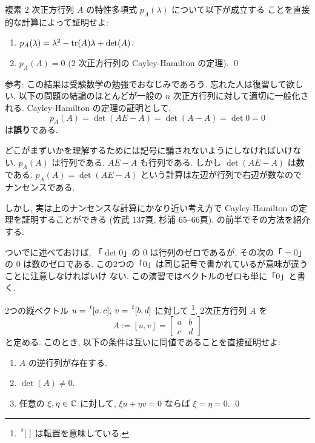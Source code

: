 \documentclass[12pt,twoside]{jarticle}
\begin{document}

\begin{question}[簡単過ぎるので3点]
  \label{q:char-poly-2.1}
  複素 $2$ 次正方行列 $A$ の特性多項式 $p_A(\lambda)$ について以下が成立する
  ことを直接的な計算によって証明せよ: 
  \begin{enumerate}
  \item[(1)] \( p_A(\lambda) = \lambda^2 - \mathop{\mathrm{tr}}\nolimits(A)\lambda + \det(A) \).
  \item[(2)] \( p_A(A) = 0 \) \quad ($2$ 次正方行列の Cayley-Hamilton の定理).
  \qed
  \end{enumerate}
\end{question}

\noindent 
参考: この結果は受験数学の勉強でおなじみであろう.
忘れた人は復習して欲しい.  
以下の問題の結論のほとんどが一般の $n$ 次正方行列に対して適切に一般化される. 
Cayley-Hamilton の定理の証明として,
\begin{equation*}
 p_A(A) = \det(AE - A) = \det(A - A) = \det 0 = 0
\end{equation*}
は{\bf 誤り}である. 

どこがまずいかを理解するためには記号に騙されないようにしなければいけない.
$p_A(A)$ は行列である.  $AE - A$ も行列である.  
しかし $\det(AE-A)$ は数である.  
$p_A(A)=\det(AE-A)$ という計算は左辺が行列で右辺が数なのでナンセンスである.

しかし, 実は上のナンセンスな計算にかなり近い考え方で 
Cayley-Hamilton の定理を証明することができる
(佐武 \cite{satake} 137頁, 杉浦 \cite{sugiura} 65--66頁).
 の前半でその方法を紹介する.

ついでに述べておけば, 「$\det 0$」の $0$ は行列のゼロであるが, 
その次の「$= 0$」の $0$ は数のゼロである.
この2つの「$0$」は同じ記号で書かれているが意味が違うことに注意しなければいけ
ない.  この演習ではベクトルのゼロも単に「$0$」と書く.


\begin{question}[5点]
  2つの縦ベクトル %
  $u=\tp{[a, c]}$, $v=\tp{[b, d]}$ に対して%
  \footnote{$\tp{[\ ]}$ は転置を意味している.}, 2次正方行列 $A$ を
  \begin{equation*}
    A := [u, v] = \begin{bmatrix} a & b \\ c & d \end{bmatrix}
  \end{equation*}
  と定める. このとき, 以下の条件は互いに同値であることを直接証明せよ:
  \begin{enumerate}
  \item[(a)] $A$ の逆行列が存在する.
  \item[(b)] $\det(A) \ne 0$.
  \item[(c)] 任意の $\xi,\eta\in{\mathbb C}$ に対して, %
    $\xi u + \eta v = 0$ ならば $\xi = \eta = 0$.
  \qed
  \end{enumerate}
\end{question}
\end{document}
